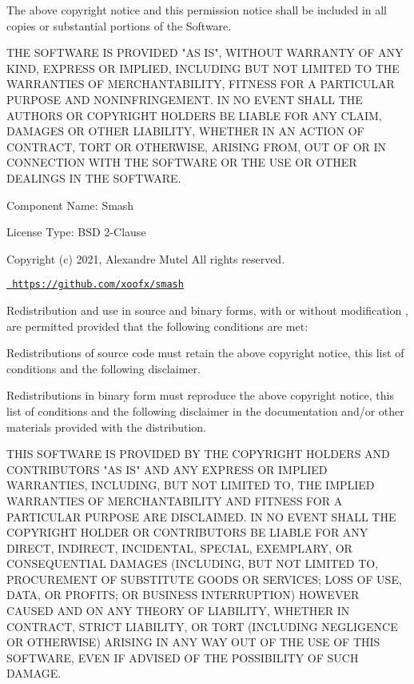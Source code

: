 The above copyright notice and this permission notice shall be included in all copies or substantial portions of the Software.

THE SOFTWARE IS PROVIDED "{}\+AS IS"{}, WITHOUT WARRANTY OF ANY KIND, EXPRESS OR IMPLIED, INCLUDING BUT NOT LIMITED TO THE WARRANTIES OF MERCHANTABILITY, FITNESS FOR A PARTICULAR PURPOSE AND NONINFRINGEMENT. IN NO EVENT SHALL THE AUTHORS OR COPYRIGHT HOLDERS BE LIABLE FOR ANY CLAIM, DAMAGES OR OTHER LIABILITY, WHETHER IN AN ACTION OF CONTRACT, TORT OR OTHERWISE, ARISING FROM, OUT OF OR IN CONNECTION WITH THE SOFTWARE OR THE USE OR OTHER DEALINGS IN THE SOFTWARE.

 Component Name\+: Smash

License Type\+: BSD 2-\/Clause

Copyright (c) 2021, Alexandre Mutel All rights reserved.

\href{https://github.com/xoofx/smash}{\texttt{ https\+://github.\+com/xoofx/smash}}

Redistribution and use in source and binary forms, with or without modification , are permitted provided that the following conditions are met\+:


\begin{DoxyEnumerate}
\item Redistributions of source code must retain the above copyright notice, this list of conditions and the following disclaimer.
\item Redistributions in binary form must reproduce the above copyright notice, this list of conditions and the following disclaimer in the documentation and/or other materials provided with the distribution.
\end{DoxyEnumerate}

THIS SOFTWARE IS PROVIDED BY THE COPYRIGHT HOLDERS AND CONTRIBUTORS "{}\+AS IS"{} AND ANY EXPRESS OR IMPLIED WARRANTIES, INCLUDING, BUT NOT LIMITED TO, THE IMPLIED WARRANTIES OF MERCHANTABILITY AND FITNESS FOR A PARTICULAR PURPOSE ARE DISCLAIMED. IN NO EVENT SHALL THE COPYRIGHT HOLDER OR CONTRIBUTORS BE LIABLE FOR ANY DIRECT, INDIRECT, INCIDENTAL, SPECIAL, EXEMPLARY, OR CONSEQUENTIAL DAMAGES (INCLUDING, BUT NOT LIMITED TO, PROCUREMENT OF SUBSTITUTE GOODS OR SERVICES; LOSS OF USE, DATA, OR PROFITS; OR BUSINESS INTERRUPTION) HOWEVER CAUSED AND ON ANY THEORY OF LIABILITY, WHETHER IN CONTRACT, STRICT LIABILITY, OR TORT (INCLUDING NEGLIGENCE OR OTHERWISE) ARISING IN ANY WAY OUT OF THE USE OF THIS SOFTWARE, EVEN IF ADVISED OF THE POSSIBILITY OF SUCH DAMAGE.

